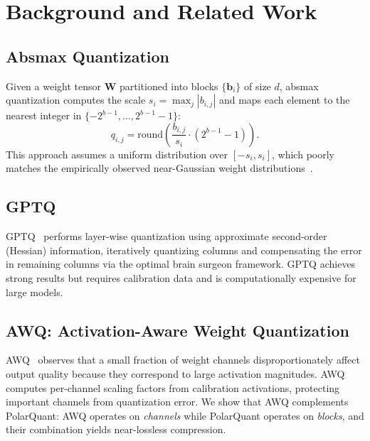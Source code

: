\documentclass[10pt,twocolumn]{article}
\newcommand{\bW}{\mathbf{W}}
\newcommand{\bb}{\mathbf{b}}
\begin{document}
\section{Background and Related Work}
\label{sec:background}

\subsection{Absmax Quantization}
\label{sec:absmax}

Given a weight tensor $\bW$ partitioned into blocks $\{\bb_i\}$ of size $d$, absmax quantization computes the scale $s_i = \max_j |b_{i,j}|$ and maps each element to the nearest integer in $\{-2^{b-1}, \ldots, 2^{b-1}-1\}$:
\begin{equation}
  q_{i,j} = \mathrm{round}\!\left(\frac{b_{i,j}}{s_i} \cdot (2^{b-1} - 1)\right).
  \label{eq:absmax}
\end{equation}
This approach assumes a uniform distribution over $[-s_i, s_i]$, which poorly matches the empirically observed near-Gaussian weight distributions~\cite{banner2019post}.

\subsection{GPTQ}
\label{sec:gptq}

GPTQ~\cite{frantar2023gptq} performs layer-wise quantization using approximate second-order (Hessian) information, iteratively quantizing columns and compensating the error in remaining columns via the optimal brain surgeon framework. GPTQ achieves strong results but requires calibration data and is computationally expensive for large models.

\subsection{AWQ: Activation-Aware Weight Quantization}
\label{sec:awq}

AWQ~\cite{lin2024awq} observes that a small fraction of weight channels disproportionately affect output quality because they correspond to large activation magnitudes. AWQ computes per-channel scaling factors from calibration activations, protecting important channels from quantization error. We show that AWQ complements PolarQuant: AWQ operates on \emph{channels} while PolarQuant operates on \emph{blocks}, and their combination yields near-lossless compression.
\end{document}
